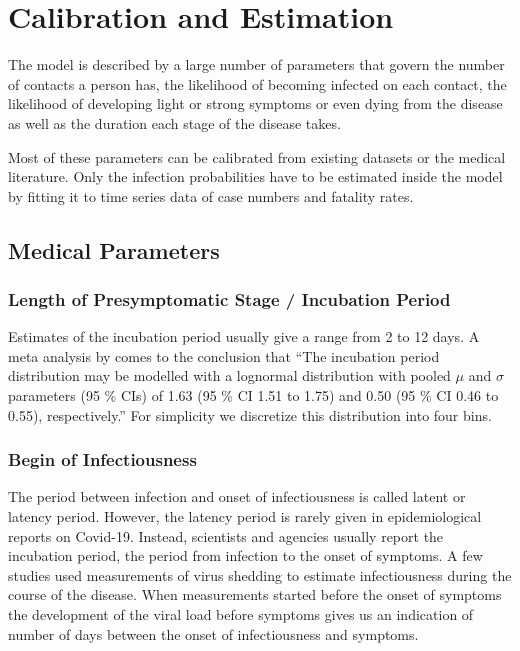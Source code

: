 \section{Calibration and Estimation}
\label{sec:calibration}

The model is described by a large number of parameters that govern the number of contacts a person has, the likelihood of becoming infected on each contact, the likelihood of developing light or strong symptoms or even dying from the disease as well as the duration each stage of the disease takes.

Most of these parameters can be calibrated from existing datasets or the medical literature. Only the infection probabilities have to be estimated inside the model by fitting it to time series data of case numbers and fatality rates.


\subsection{Medical Parameters}

\subsubsection{Length of Presymptomatic Stage / Incubation Period}


Estimates of the incubation period usually give a range from 2 to 12 days. A meta analysis by \cite{McAloon2020} comes to the conclusion that ``The incubation period distribution may be modelled with a lognormal distribution with pooled $\mu$ and $\sigma$ parameters (95 \% CIs) of 1.63 (95 \% CI 1.51 to 1.75) and 0.50 (95 \% CI 0.46 to 0.55), respectively.'' For simplicity we discretize this distribution into four bins.


\subsubsection{Begin of Infectiousness}

The period between infection and onset of infectiousness is called latent or latency period. However, the latency period is rarely given in epidemiological reports on Covid-19. Instead, scientists and agencies usually report the incubation period, the period from infection to the onset of symptoms. A few studies used measurements of virus shedding to estimate infectiousness during the course of the disease. When measurements started before the onset of symptoms the development of the viral load before symptoms gives us an indication of number of days between the onset of infectiousness and symptoms.

